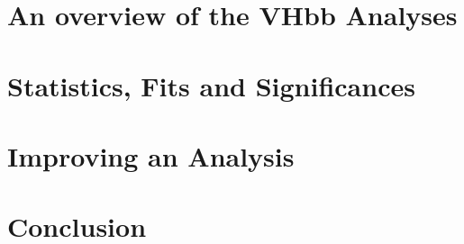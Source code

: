 \documentclass[12pt,titlepage,oneside]{book}
\begin{document}
\chapter{An overview of the VHbb Analyses}
\label{chap:Analyses}


\chapter{Statistics, Fits and Significances}
\label{chap:Statfits}


\chapter{Improving an Analysis}
\label{chap:METTriggerStudy}


\chapter{Conclusion}
\label{chap:conc}


\backmatter  %


\end{document}
